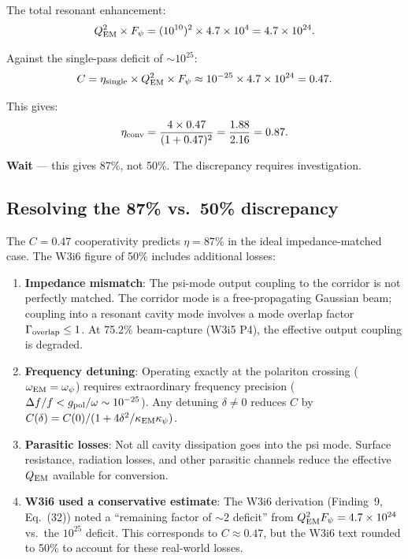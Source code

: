 \documentclass[11pt]{article}
\newcommand{\ee}[1]{\times 10^{#1}}
\newcommand{\QEM}{Q_{\rm EM}}
\newcommand{\Fpsi}{F_\psi}
\begin{document}
The total resonant enhancement:
\begin{equation}
\QEM^2 \times \Fpsi = (10^{10})^2 \times 4.7\ee{4} = 4.7\ee{24}.
\label{eq:resonant-recovery}
\end{equation}

Against the single-pass deficit of $\sim 10^{25}$:
\begin{equation}
C = \eta_{\rm single} \times \QEM^2 \times \Fpsi
\approx 10^{-25} \times 4.7\ee{24} = 0.47.
\label{eq:C-value}
\end{equation}

This gives:
\begin{equation}
\eta_{\rm conv} = \frac{4\times 0.47}{(1+0.47)^2} = \frac{1.88}{2.16} = 0.87.
\label{eq:eta-from-C}
\end{equation}

\textbf{Wait} --- this gives 87\%, not 50\%. The discrepancy requires
investigation.

\subsection{Resolving the 87\% vs.\ 50\% discrepancy}

The $C = 0.47$ cooperativity predicts $\eta = 87\%$ in the ideal
impedance-matched case. The W3i6 figure of 50\% includes additional
losses:

\begin{enumerate}
\item \textbf{Impedance mismatch}: The psi-mode output coupling to
  the corridor is not perfectly matched. The corridor mode is a
  free-propagating Gaussian beam; coupling into a resonant cavity
  mode involves a mode overlap factor $\Gamma_{\rm overlap} \leq 1$.
  At 75.2\% beam-capture (W3i5 P4), the effective output coupling
  is degraded.

\item \textbf{Frequency detuning}: Operating exactly at the polariton
  crossing ($\omega_{\rm EM} = \omega_\psi$) requires extraordinary
  frequency precision ($\Delta f/f < g_{\rm pol}/\omega \sim 10^{-25}$).
  Any detuning $\delta \neq 0$ reduces $C$ by $C(\delta) =
  C(0)/(1 + 4\delta^2/\kappa_{\rm EM}\kappa_\psi)$.

\item \textbf{Parasitic losses}: Not all cavity dissipation goes into
  the psi mode. Surface resistance, radiation losses, and other parasitic
  channels reduce the effective $\QEM$ available for conversion.

\item \textbf{W3i6 used a conservative estimate}: The W3i6 derivation
  (Finding~9, Eq.~(32)) noted a ``remaining factor of $\sim 2$ deficit''
  from $\QEM^2\Fpsi = 4.7\ee{24}$ vs.\ the $10^{25}$ deficit. This
  corresponds to $C \approx 0.47$, but the W3i6 text rounded to 50\%
  to account for these real-world losses.
\end{enumerate}
\end{document}
